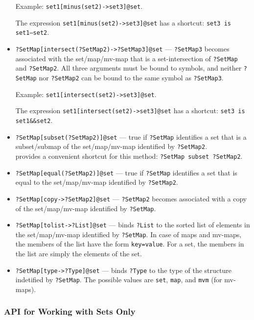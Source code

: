 \begin{itemize}
  Example: \texttt{set1[minus(set2)->set3]@\bs{}set}. 

  The expression \texttt{set1[minus(set2)->set3]@\bs{}set} has a shortcut:  \texttt{set3 \bs{}is set1--set2}.   

  \item \texttt{?SetMap[intersect(?SetMap2)->?SetMap3]@\bs{}set} --- \texttt{?SetMap3}
  becomes associated with the set/map/mv-map that is a set-intersection of \texttt{?SetMap}
  and \texttt{?SetMap2}. All three arguments must be bound to symbols, and
  neither \texttt{?SetMap} nor
  \texttt{?SetMap2} can be bound to the same symbol as
  \texttt{?SetMap3}.

  Example: \texttt{set1[intersect(set2)->set3]@\bs{}set}. 

  The expression \texttt{set1[intersect(set2)->set3]@\bs{}set} has a shortcut:  \texttt{set3 \bs{}is set1\&\&set2}. 

\item \texttt{?SetMap[subset(?SetMap2)]@\bs{}set} --- true if \texttt{?SetMap}
  identifies a set that is a subset/submap of the set/map/mv-map identified by
  \texttt{?SetMap2}.
  \\
  \ERGO provides a convenient shortcut for this method: \texttt{?SetMap
  \bs{}subset ?SetMap2}.  
\item \texttt{?SetMap[equal(?SetMap2)]@\bs{}set} --- true if \texttt{?SetMap}
  identifies a set that is equal to the set/map/mv-map identified by \texttt{?SetMap2}.
\item \texttt{?SetMap[copy->?SetMap2]@\bs{}set} --- \texttt{?SetMap2} becomes
  associated with a copy of the set/map/mv-map identified by \texttt{?SetMap}.  
\item \texttt{?SetMap[tolist->?List]@\bs{}set} --- binds \texttt{?List} to
  the sorted list of elements in the set/map/mv-map identified by
  \texttt{?SetMap}. In case of maps and mv-maps, the members of the
  list have the form \texttt{key=value}.  For a set, the members in
  the list are simply the elements of the set.
\item \texttt{?SetMap[type->?Type]@\bs{}set} --- binds \texttt{?Type} to
  the type of the structure indetified by \texttt{?SetMap}. The possible
  values are \texttt{set}, \texttt{map},    and \texttt{mvm} (for mv-maps). 
\end{itemize}

\subsubsection{API for Working with Sets Only} \label{sec-api-set}

